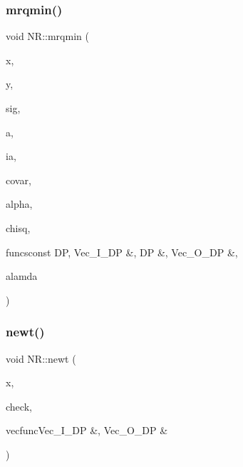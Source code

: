 \subsubsection{\texorpdfstring{mrqmin()}{mrqmin()}}
{\footnotesize\ttfamily void N\+R\+::mrqmin (\begin{DoxyParamCaption}\item[{\mbox{\hyperlink{namespaceNR_a9f943da53862537c552e2a770cb170ae}{Vec\+\_\+\+I\+\_\+\+DP}} \&}]{x,  }\item[{\mbox{\hyperlink{namespaceNR_a9f943da53862537c552e2a770cb170ae}{Vec\+\_\+\+I\+\_\+\+DP}} \&}]{y,  }\item[{\mbox{\hyperlink{namespaceNR_a9f943da53862537c552e2a770cb170ae}{Vec\+\_\+\+I\+\_\+\+DP}} \&}]{sig,  }\item[{\mbox{\hyperlink{namespaceNR_ab293e06a6bf799d8a7ed932b6852bcb8}{Vec\+\_\+\+I\+O\+\_\+\+DP}} \&}]{a,  }\item[{\mbox{\hyperlink{namespaceNR_a70331f3de2cf735819b5719e4048d7f3}{Vec\+\_\+\+I\+\_\+\+B\+O\+OL}} \&}]{ia,  }\item[{\mbox{\hyperlink{namespaceNR_adc1f8da33094b6bbeb1f5f899515ce54}{Mat\+\_\+\+O\+\_\+\+DP}} \&}]{covar,  }\item[{\mbox{\hyperlink{namespaceNR_adc1f8da33094b6bbeb1f5f899515ce54}{Mat\+\_\+\+O\+\_\+\+DP}} \&}]{alpha,  }\item[{\mbox{\hyperlink{namespaceNR_af6ff762dd605ff477b8e52387253a02a}{DP}} \&}]{chisq,  }\item[{void }]{funcsconst D\+P, Vec\+\_\+\+I\+\_\+\+D\+P \&, D\+P \&, Vec\+\_\+\+O\+\_\+\+D\+P \&,  }\item[{\mbox{\hyperlink{namespaceNR_af6ff762dd605ff477b8e52387253a02a}{DP}} \&}]{alamda }\end{DoxyParamCaption})}

\mbox{\label{namespaceNR_aa58f9fd3b532e550929b4ffa67b50e4d}} 
\subsubsection{\texorpdfstring{newt()}{newt()}}
{\footnotesize\ttfamily void N\+R\+::newt (\begin{DoxyParamCaption}\item[{\mbox{\hyperlink{namespaceNR_ab293e06a6bf799d8a7ed932b6852bcb8}{Vec\+\_\+\+I\+O\+\_\+\+DP}} \&}]{x,  }\item[{bool \&}]{check,  }\item[{void }]{vecfuncVec\+\_\+\+I\+\_\+\+D\+P \&, Vec\+\_\+\+O\+\_\+\+D\+P \& }\end{DoxyParamCaption})}

